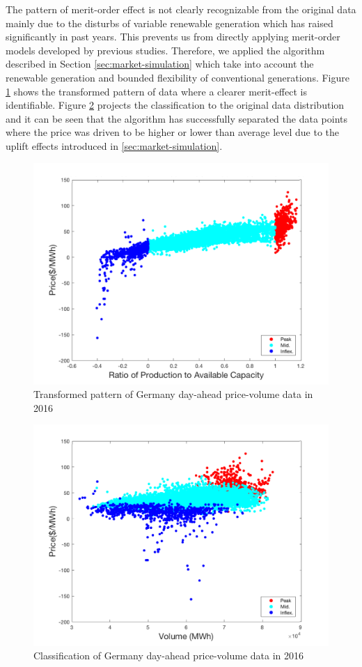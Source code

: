 The pattern of merit-order effect is not clearly recognizable from the original data mainly due to the disturbs of variable renewable generation which has raised significantly in past years. This prevents us from directly applying merit-order models developed by previous studies\cite{He2013}\cite{Grunewald2012a}. Therefore, we applied the algorithm described in Section \ref{sec:market-simulation} which take into account the renewable generation and bounded flexibility of conventional generations. Figure \ref{fig:merit-transformed} shows the transformed pattern of data where a clearer merit-effect is identifiable. Figure \ref{fig:merit-classified} projects the classification to the original data distribution and it can be seen that the algorithm has successfully separated the data points where the price was driven to be higher or lower than average level due to the uplift effects introduced in \ref{sec:market-simulation}. 

\begin{figure}[h!]
	\centering
	\includegraphics[width=0.95\linewidth]{Figures/Merit-order-transformed}
	\caption{Transformed pattern of Germany day-ahead price-volume data in 2016}
	\label{fig:merit-transformed}
\end{figure}
\begin{figure}[h!]
	\centering
	\includegraphics[width=0.95\linewidth]{Figures/Merit-order-classified}
	\caption{Classification of Germany day-ahead price-volume data in 2016}
	\label{fig:merit-classified}
\end{figure}

